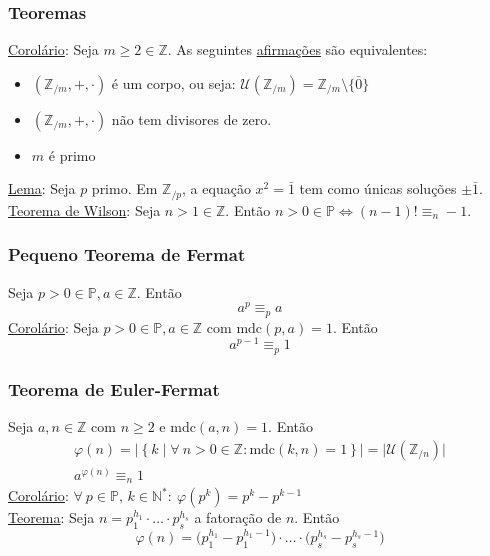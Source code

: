 \documentclass{article}
\begin{document}
\subsubsection{Teoremas}
\uline{Corolário}: Seja $m \geq 2 \in \mathbb{Z}$. As seguintes \uline{afirmações} são equivalentes:
\begin{itemize}
  \setlength\itemsep{0px}
  \item $(\mathbb{Z}_{/m}, +, \cdot)$ é um corpo, ou seja: $\mathcal{U}(\mathbb{Z}_{/m}) = \mathbb{Z}_{/m} \setminus \{\bar{0}\}$
  \item $(\mathbb{Z}_{/m}, +, \cdot)$ não tem divisores de zero.
  \item $m$ é primo
\end{itemize}
\uline{Lema}: Seja $p$ primo. Em $\mathbb{Z}_{/p}$, a equação $x^2 = \bar{1}$ tem como únicas soluções $\pm \bar{1}$. \\[10pt]
\uline{Teorema de Wilson}: Seja $n > 1 \in \mathbb{Z}$. Então $n > 0 \in \mathbb{P} \iff (n - 1)! \equiv_n -1$.

\subsubsection{Pequeno Teorema de Fermat}
Seja $p > 0 \in \mathbb{P}, a \in \mathbb{Z}$. Então
\[ a^p \equiv_p a \]
\uline{Corolário}: Seja $p > 0 \in \mathbb{P}, a \in \mathbb{Z}$ com $\text{mdc}(p,a) = 1$. Então
\[ a^{p-1} \equiv_p 1 \]

\subsubsection{Teorema de Euler-Fermat}
Seja $a, n \in \mathbb{Z}$ com $n \geq 2$ e $\text{mdc}(a,n) = 1$. Então
\begin{gather*}
  \varphi(n) = \big| \left\{ k \mid \forall\: n > 0 \in \mathbb{Z}: \text{mdc}(k,n) = 1 \right\} \big| = \big| \mathcal{U}(\mathbb{Z}_{/n}) \big| \\[5pt]
  a^{\varphi(n)} \equiv_n 1
\end{gather*}
\uline{Corolário}: $\forall\: p \in \mathbb{P},\, k \in \mathbb{N}^*: \> \varphi \left( p^k \right) = p^k - p^{k-1}$ \\[10pt]
\uline{Teorema}: Seja $n = p_1^{h_1} \cdot \hdots \cdot p_s^{h_s}$ a fatoração de $n$. Então
\[ \varphi(n) =  \Big( p_1^{h_1} - p_1^{h_1 - 1} \Big) \cdot \hdots \cdot \Big( p_s^{h_s} - p_s^{h_s - 1} \Big) \]
\end{document}
